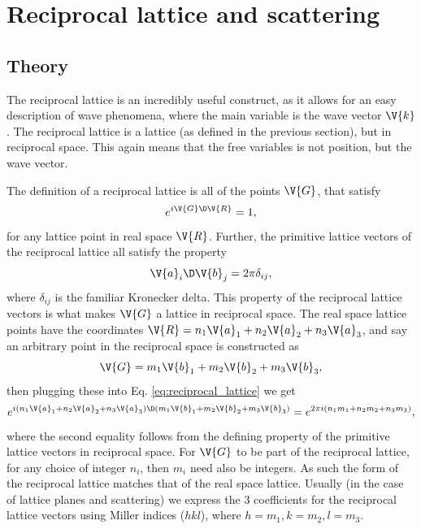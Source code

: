 \documentclass[main.tex]{subfiles}
\begin{document}
	\section{Reciprocal lattice and scattering} \label{sec:scattering}
	\subsection{Theory}
	The reciprocal lattice is an incredibly useful construct, as it allows for an easy description of wave phenomena, where the main variable is the wave vector $ \V{k} $. The reciprocal lattice is a lattice (as defined in the previous section), but in reciprocal space. This again means that the free variables is not position, but the wave vector.
	
	The definition of a reciprocal lattice is all of the points $ \V{G} $, that satisfy
	\begin{equation}\label{eq:reciprocal_lattice}
		e^{i \V{G} \D \V{R}} = 1,
	\end{equation}
	for any lattice point in real space $ \V{R} $. Further, the primitive lattice vectors of the reciprocal lattice all satisfy the property
	\begin{equation}\label{eq:rec_prim_def}
		\V{a}_i \D \V{b}_j = 2\pi \delta_{ij},
	\end{equation}
	where $ \delta_{ij} $ is the familiar Kronecker delta. This property of the reciprocal lattice vectors is what makes $ \V{G} $ a lattice in reciprocal space. The real space lattice points have the coordinates $ \V{R} = n_1 \V{a}_1 + n_2 \V{a}_2 + n_3 \V{a}_3 $, and say an arbitrary point in the reciprocal space is constructed as
	\begin{equation}\label{eq:rec_lat_vec}
		\V{G} = m_1 \V{b}_1 + m_2 \V{b}_2 + m_3 \V{b}_3,
	\end{equation}
	then plugging these into Eq. \eqref{eq:reciprocal_lattice} we get
	\begin{equation}
		e^{i (n_1 \V{a}_1 + n_2 \V{a}_2 + n_3 \V{a}_3) \D (m_1 \V{b}_1 + m_2 \V{b}_2 + m_3 \V{b}_3)} = e^{2\pi i (n_1 m_1 + n_2 m_2 + n_3 m_3)},
	\end{equation}
	where the second equality follows from the defining property of the primitive lattice vectors in reciprocal space. For $ \V{G} $ to be part of the reciprocal lattice, for any choice of integer $ n_i $, then $ m_i $ need also be integers. As such the form of the reciprocal lattice matches that of the real space lattice. Usually (in the case of lattice planes and scattering) we express the 3 coefficients for the reciprocal lattice vectors using Miller indices ($ hkl $), where $ h=m_1, k=m_2, l=m_3 $.
	
\end{document}

